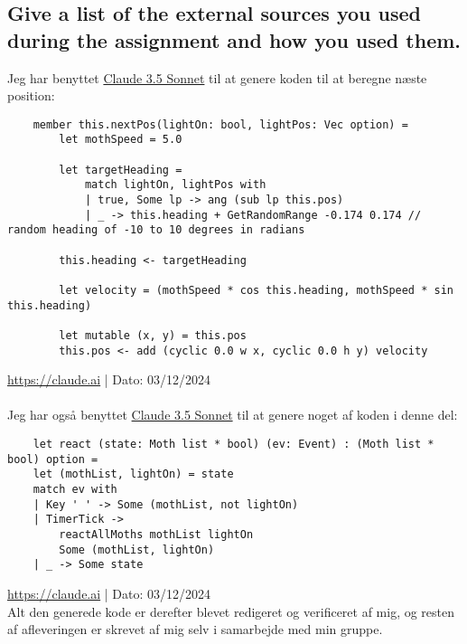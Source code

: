 \documentclass[a4paper,12pt]{article}
\begin{document}
\subsection{Give a list of the external sources you used during the assignment and how you used them.}
Jeg har benyttet \href{https://claude.ai}{Claude 3.5 Sonnet} til at genere koden til at beregne næste position:
\begin{lstlisting}
    member this.nextPos(lightOn: bool, lightPos: Vec option) = 
        let mothSpeed = 5.0

        let targetHeading =
            match lightOn, lightPos with
            | true, Some lp -> ang (sub lp this.pos)
            | _ -> this.heading + GetRandomRange -0.174 0.174 // random heading of -10 to 10 degrees in radians

        this.heading <- targetHeading

        let velocity = (mothSpeed * cos this.heading, mothSpeed * sin this.heading)

        let mutable (x, y) = this.pos
        this.pos <- add (cyclic 0.0 w x, cyclic 0.0 h y) velocity
\end{lstlisting}
\url{https://claude.ai} | Dato: 03/12/2024\\
\\
Jeg har også benyttet \href{https://claude.ai}{Claude 3.5 Sonnet} til at genere noget af koden i denne del:
\begin{lstlisting}
    let react (state: Moth list * bool) (ev: Event) : (Moth list * bool) option =
    let (mothList, lightOn) = state
    match ev with
    | Key ' ' -> Some (mothList, not lightOn)
    | TimerTick -> 
        reactAllMoths mothList lightOn
        Some (mothList, lightOn)
    | _ -> Some state 
\end{lstlisting}
\url{https://claude.ai} | Dato: 03/12/2024\\
Alt den generede kode er derefter blevet redigeret og verificeret af mig, og resten af afleveringen er skrevet af mig selv i samarbejde med min gruppe.

\end{document}
